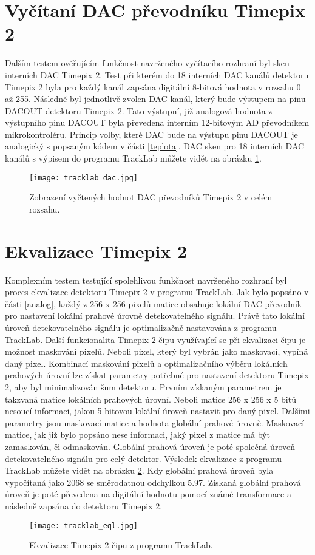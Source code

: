 \section{Vyčítaní DAC převodníku Timepix 2}
	Dalším testem ověřujícím funkčnost navrženého vyčítacího rozhraní byl sken interních DAC Timepix 2. Test při kterém do 18 interních DAC kanálů detektoru Timepix 2 byla pro každý kanál zapsána digitální 8-bitová hodnota v rozsahu 0 až 255. Následně byl jednotlivě zvolen DAC kanál, který bude výstupem na pinu DACOUT detektoru Timepix 2. Tato výstupní, již analogová hodnota z výstupního pinu DACOUT byla převedena interním 12-bitovým AD převodníkem mikrokontroléru. Princip volby, které DAC bude na výstupu pinu DACOUT je analogický s popsaným kódem v části \ref{teplota}. DAC sken pro 18 interních DAC kanálů s výpisem do programu TrackLab můžete vidět na obrázku \ref{fig:dacscan}. 
	\begin{figure}[h!]
		\centering
		\captionsetup{justification=centering}
		\texttt{[image: tracklab\_dac.jpg]}
		\caption{Zobrazení vyčtených hodnot DAC převodníků Timepix 2 v celém rozsahu.} 
		\label{fig:dacscan}
	\end{figure}

\section{Ekvalizace Timepix 2}
	Komplexním testem testující spolehlivou funkčnost navrženého rozhraní byl proces ekvalizace detektoru Timepix 2 v programu TrackLab. Jak bylo popsáno v části \ref{analog}, každý z 256 x 256 pixelů matice obsahuje lokální DAC převodník pro nastavení lokální prahové úrovně detekovatelného signálu. Právě tato lokální úroveň detekovatelného signálu je optimalizačně nastavována z programu TrackLab. Další funkcionalita Timepix 2 čipu využívající se při ekvalizaci čipu je možnost maskování pixelů. Neboli pixel, který byl vybrán jako maskovací, vypíná daný pixel. Kombinací maskování pixelů a optimalizačního výběru lokálních prahových úrovní lze získat parametry potřebné pro nastavení detektoru Timepix 2, aby byl minimalizován šum detektoru. Prvním získaným parametrem je takzvaná matice lokálních prahových úrovní. Neboli matice 256 x 256 x 5 bitů nesoucí informaci, jakou 5-bitovou lokální úroveň nastavit pro daný pixel. Dalšími parametry jsou maskovací matice a hodnota globální prahové úrovně. Maskovací matice, jak již bylo popsáno nese informaci, jaký pixel z matice má být zamaskován, či odmaskován. Globální prahová úroveň je poté společná úroveň detekovatelného signálu pro celý detektor. Výsledek ekvalizace z programu TrackLab můžete vidět na obrázku \ref{fig:tracklab_eql}. Kdy globální prahová úroveň byla vypočítaná jako 2068 se směrodatnou odchylkou 5.97. Získaná globální prahová úroveň je poté převedena na digitální hodnotu pomocí známé transformace a následně zapsána do detektoru Timepix 2.
	\begin{figure}[h!]
		\centering
		\captionsetup{justification=centering}
		\texttt{[image: tracklab\_eql.jpg]}
		\caption{Ekvalizace Timepix 2 čipu z programu TrackLab.} 
		\label{fig:tracklab_eql}
	\end{figure}

